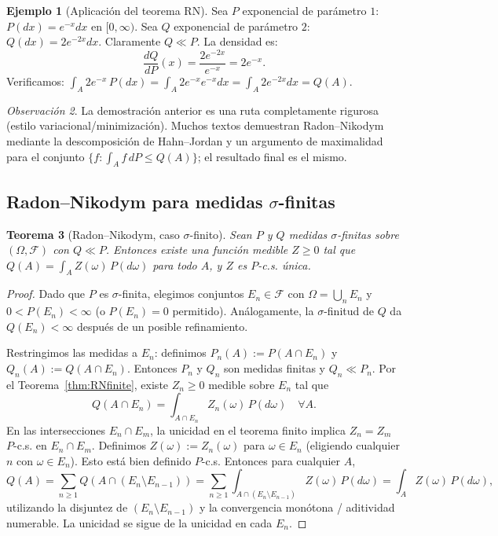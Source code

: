 \documentclass[11pt,a4paper]{article}
\theoremstyle{plain}
\newtheorem{theorem}{Teorema}[section]
\theoremstyle{definition}
\newtheorem{example}[theorem]{Ejemplo}
\theoremstyle{remark}
\newtheorem{remark}[theorem]{Observación}
\newcommand{\1}{\mathbf{1}}
\newcommand{\cF}{\mathcal{F}}
\begin{document}
\begin{example}[Aplicación del teorema RN]
Sea $P$ exponencial de parámetro $1$: $P(dx)=e^{-x}dx$ en $[0,\infty)$. Sea $Q$ exponencial de parámetro $2$: $Q(dx)=2e^{-2x}dx$. Claramente $Q\ll P$. La densidad es:
\[
\frac{dQ}{dP}(x) = \frac{2e^{-2x}}{e^{-x}} = 2e^{-x}.
\]
Verificamos: $\int_A 2e^{-x}\,P(dx) = \int_A 2e^{-x}e^{-x}dx = \int_A 2e^{-2x}dx = Q(A)$.
\end{example}

\begin{remark}
La demostración anterior es una ruta completamente rigurosa (estilo variacional/minimización). Muchos textos demuestran Radon--Nikodym mediante la descomposición de Hahn--Jordan y un argumento de maximalidad para el conjunto $\{f:\int_A f\,dP\le Q(A)\}$; el resultado final es el mismo.
\end{remark}

\subsection{Radon--Nikodym para medidas $\sigma$-finitas}

\begin{theorem}[Radon--Nikodym, caso $\sigma$-finito]
\label{thm:RNsigmafinite}
Sean $P$ y $Q$ medidas $\sigma$-finitas sobre $(\Omega,\cF)$ con $Q\ll P$.
Entonces existe una función medible $Z\ge0$ tal que $Q(A)=\int_A Z(\omega)\,P(d\omega)$ para todo $A$, y $Z$ es $P$-c.s. única.
\end{theorem}

\begin{proof}
Dado que $P$ es $\sigma$-finita, elegimos conjuntos $E_n\in\cF$ con $\Omega=\bigcup_n E_n$ y $0<P(E_n)<\infty$ (o $P(E_n)=0$ permitido).
Análogamente, la $\sigma$-finitud de $Q$ da $Q(E_n)<\infty$ después de un posible refinamiento.

Restringimos las medidas a $E_n$: definimos $P_n(A):=P(A\cap E_n)$ y $Q_n(A):=Q(A\cap E_n)$.
Entonces $P_n$ y $Q_n$ son medidas finitas y $Q_n\ll P_n$.
Por el Teorema~\ref{thm:RNfinite}, existe $Z_n\ge0$ medible sobre $E_n$ tal que
\[
Q(A\cap E_n)=\int_{A\cap E_n} Z_n(\omega)\,P(d\omega) \quad \forall A.
\]
En las intersecciones $E_n\cap E_m$, la unicidad en el teorema finito implica $Z_n=Z_m$ $P$-c.s. en $E_n\cap E_m$.
Definimos $Z(\omega):=Z_n(\omega)$ para $\omega\in E_n$ (eligiendo cualquier $n$ con $\omega\in E_n$). Esto está bien definido $P$-c.s.
Entonces para cualquier $A$,
\[
Q(A)=\sum_{n\ge1} Q(A\cap (E_n\setminus E_{n-1}))
=\sum_{n\ge1} \int_{A\cap (E_n\setminus E_{n-1})} Z(\omega)\,P(d\omega)
=\int_A Z(\omega)\,P(d\omega),
\]
utilizando la disjuntez de $(E_n\setminus E_{n-1})$ y la convergencia monótona / aditividad numerable.
La unicidad se sigue de la unicidad en cada $E_n$.
\end{proof}
\end{document}
